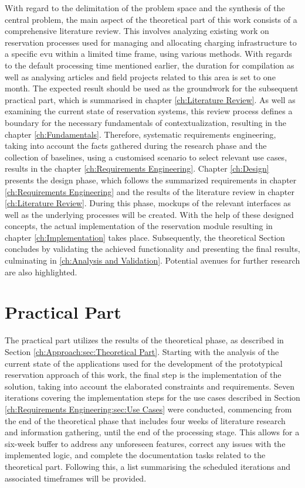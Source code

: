 With regard to the delimitation of the problem space and the synthesis of the central problem, the main aspect of the theoretical part of this work consists of a comprehensive literature review.
This involves analyzing existing work on reservation processes used for managing  and allocating charging infrastructure to a specific \acrshort{evu} within a limited time frame, using various methods.
With regards to the default processing time mentioned earlier, the duration for compilation as well as analysing articles and field projects related to this area is set to one month. 
The expected result should be used as the groundwork for the subsequent practical part, which is summarised in chapter \ref{ch:Literature Review}.
As well as examining the current state of reservation systems, this review process defines a boundary for the necessary fundamentals of contextualization, resulting in the chapter \ref{ch:Fundamentals}.
Therefore, systematic requirements engineering, taking into account the facts gathered during the research phase and the collection of baselines, using a customised scenario to select relevant use cases, results in the chapter \ref{ch:Requirements Engineering}.
Chapter \ref{ch:Design} presents the design phase, which follows the summarized requirements in chapter \ref{ch:Requirements Engineering} and the results of the literature review in chapter \ref{ch:Literature Review}. During this phase, mockups of the relevant interfaces as well as the underlying processes will be created.
With the help of these designed concepts, the actual implementation of the reservation module resulting in chapter \ref{ch:Implementation} takes place.
Subsequently, the theoretical Section concludes by validating the achieved functionality and presenting the final results, culminating in \ref{ch:Analysis and Validation}. Potential avenues for further research are also highlighted.

\section{Practical Part}
\label{ch:Approach:sec:Practical Part}

The practical part utilizes the results of the theoretical phase, as described in Section \ref{ch:Approach:sec:Theoretical Part}. Starting with the analysis of the current state of the applications used for the development of the prototypical reservation approach of this work, the final step is the implementation of the solution, taking into account the elaborated constraints and requirements.
Seven iterations covering the implementation steps for the use cases described in Section \ref{ch:Requirements Engineering:sec:Use Cases} were conducted, commencing from the end of the theoretical phase that includes four weeks of literature research and information gathering, until the end of the processing stage.
This allows for a six-week buffer to address any unforeseen features, correct any issues with the implemented logic, and complete the documentation tasks related to the theoretical part.
Following this, a list summarising the scheduled iterations and associated timeframes will be provided.

